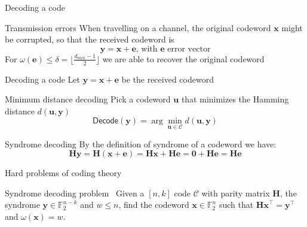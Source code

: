 \begin{frame}{Decoding a code}
    \begin{block}{Transmission errors}
        When travelling on a channel, the original codeword $\mathbf{x}$ might be corrupted, so that the received codeword is 
        \begin{equation*}
            \mathbf{y} = \mathbf{x} + \mathbf{e} \text{, with } \mathbf{e} \text{ error vector}
        \end{equation*}
        For $\omega(\mathbf{e}) \leq \delta = \lfloor \frac{d_{min} - 1}{2} \rfloor$ we are able to recover the original codeword
    \end{block}
\end{frame}

\begin{frame}{Decoding a code}
    Let $\mathbf{y = x+e}$ be the received codeword
    \begin{block}{Minimum distance decoding}
        Pick a codeword $\mathbf{u}$ that minimizes the Hamming distance $d(\mathbf{u, y})$\
        \begin{equation*}
            \textsf{Decode}(\mathbf{y}) = \arg\min_{\mathbf{u} \in \mathcal{C}} d(\mathbf{u, y})
        \end{equation*}
    \end{block}
    \begin{block}{Syndrome decoding}
        By the definition of syndrome of a codeword we have:
        \begin{equation*}
            \mathbf{Hy} = \mathbf{H(x+e)} = \mathbf{Hx+He} = \mathbf{0 + He} = \mathbf{He} 
        \end{equation*}
    \end{block}
\end{frame}

\begin{frame}{Hard problems of coding theory}
    \begin{block}{Syndrome decoding problem~\cite{berlekamp1978inherent}}
        Given a $[n, k]$ code $\mathcal{C}$ with parity matrix $\mathbf{H}$, the syndrome $\mathbf{y} \in \mathds{F}_2^{n-k}$ and $w \leq n$, find
        the codeword $\mathbf{x} \in \mathds{F}_2^n$ such that $\mathbf{Hx}^\top = \mathbf{y}^\top$ and $\omega(\mathbf{x}) = w$. 
    \end{block}
\end{frame}
